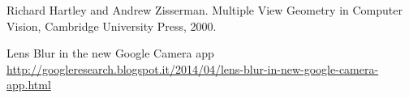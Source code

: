 
\begin{thebibliography}{99}

 Richard Hartley and Andrew Zisserman. Multiple View Geometry in Computer Vision, Cambridge University Press, 2000.

 Lens Blur in the new Google Camera app \newline
\url{http://googleresearch.blogspot.it/2014/04/lens-blur-in-new-google-camera-app.html}




\end{thebibliography}
\clearpage
\thispagestyle{empty}
